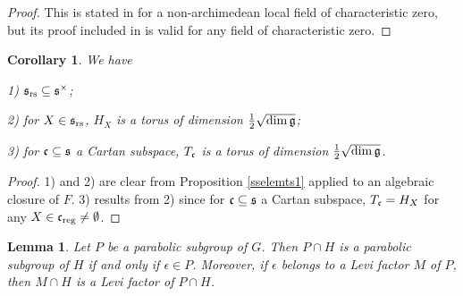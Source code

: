 \documentclass[a4paper]{amsart}
\newtheorem{coro}[thm]{Corollary}
\newtheorem{lem}[thm]{Lemma}
\theoremstyle{definition}
\theoremstyle{remark}
\numberwithin{equation}{subsection}
\begin{document}
\begin{proof}
  This is stated in \cite[Proposition 5.2]{MR3299843} for a non-archimedean local field of characteristic zero, but its proof included in \cite[Propositions 2.1 and 2.2]{MR1394521} is valid for any field of characteristic zero. 
\end{proof}

\begin{coro}\label{corsselemts1}
We have 

	1) ${\mathfrak{s}}_{\mathrm{rs}}\subseteq{\mathfrak{s}}^\times$; 
	
	2) for $X\in{\mathfrak{s}}_{\mathrm{rs}}$, $H_X$ is a torus of dimension $\frac{1}{2} \sqrt{\dim{\mathfrak{g}}}$; 
	
	3) for ${\mathfrak{c}}\subseteq{\mathfrak{s}}$ a Cartan subspace, $T_{\mathfrak{c}}$ is a torus of dimension $\frac{1}{2} \sqrt{\dim{\mathfrak{g}}}$. 
\end{coro}

\begin{proof}
	1) and 2) are clear from Proposition \ref{sselemts1} applied to an algebraic closure of $F$. 3) results from 2) since for ${\mathfrak{c}}\subseteq{\mathfrak{s}}$ a Cartan subspace, $T_{\mathfrak{c}}=H_X$ for any $X\in{\mathfrak{c}}_{\mathrm{reg}}\neq\emptyset$. 
\end{proof}

\begin{lem}\label{intpar1}
Let $P$ be a parabolic subgroup of $G$. Then $P\cap H$ is a parabolic subgroup of $H$ if and only if $\epsilon\in P$. Moreover, if $\epsilon$ belongs to a Levi factor $M$ of $P$, then $M\cap H$ is a Levi factor of $P\cap H$. 
\end{lem}
\end{document}
